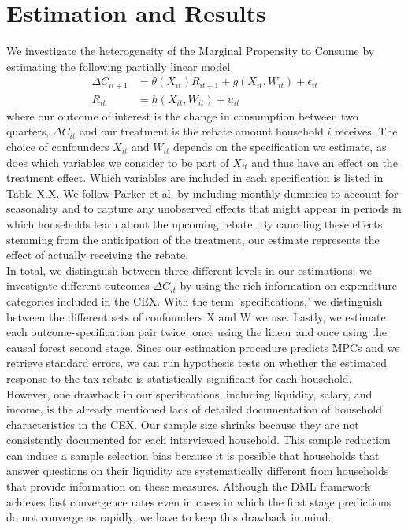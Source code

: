 \section{Estimation and Results} \label{sec:estim_res}
We investigate the heterogeneity of the Marginal Propensity to Consume by estimating the following partially linear model
\begin{align}
    \Delta C_{it+1}&=\theta(X_{it})R_{it+1}+g(X_{it}, W_{it})+\epsilon_{it} \label{eq:plm_C1}\\
    R_{it}&=h(X_{it}, W_{it})+u_{it} \label{eq:plm_C2}
\end{align}
where our outcome of interest is the change in consumption between two quarters, $\Delta C_{it}$ and our treatment is the rebate amount household $i$ receives. The choice of confounders $X_{it}$ and $W_{it}$ depends on the specification we estimate, as does which variables we consider to be part of $X_{it}$ and thus have an effect on the treatment effect. Which variables are included in each specification is listed in Table X.X. We follow Parker et al. by including monthly dummies to account for seasonality and to capture any unobserved effects that might appear in periods in which households learn about the upcoming rebate. By canceling these effects stemming from the anticipation of the treatment, our estimate represents the effect of actually receiving the rebate. \\ 
In total, we distinguish between three different levels in our estimations: we investigate different outcomes $\Delta C_{it}$ by using the rich information on expenditure categories included in the CEX. With the term 'specifications,' we distinguish between the different sets of confounders X and W we use. Lastly, we estimate each outcome-specification pair twice: once using the linear and once using the causal forest second stage. Since our estimation procedure predicts MPCs and we retrieve standard errors, we can run hypothesis tests on whether the estimated response to the tax rebate is statistically significant for each household. \\
However, one drawback in our specifications, including liquidity, salary, and income, is the already mentioned lack of detailed documentation of household characteristics in the CEX. Our sample size shrinks because they are not consistently documented for each interviewed household. This sample reduction can induce a sample selection bias because it is possible that households that answer questions on their liquidity are systematically different from households that provide information on these measures. Although the DML framework achieves fast convergence rates even in cases in which the first stage predictions do not converge as rapidly, we have to keep this drawback in mind. 

